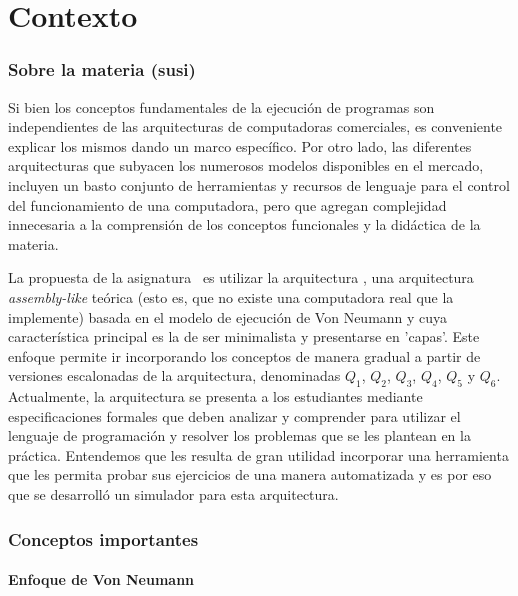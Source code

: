 \part{Contexto}
\section{Sobre la materia \orga (susi)}


Si bien los conceptos fundamentales de la ejecución de programas son independientes de las arquitecturas de computadoras comerciales, es conveniente explicar los mismos dando un marco específico. Por otro lado, las diferentes arquitecturas que subyacen los numerosos modelos disponibles en el mercado, incluyen un basto conjunto de herramientas y recursos de lenguaje para el control del funcionamiento de una computadora, pero que agregan complejidad innecesaria a la comprensión de los conceptos funcionales y la didáctica de la materia.

La propuesta de la asignatura \orga\ es utilizar la arquitectura \Q, una arquitectura \textit{assembly-like} teórica (esto es, que no existe una computadora real que la implemente) basada en el modelo de ejecución de Von Neumann y cuya característica principal es la de ser minimalista y presentarse en 'capas'. Este enfoque permite ir incorporando los conceptos de manera gradual a partir de versiones escalonadas de la arquitectura, denominadas $Q_1$, $Q_2$, $Q_3$, $Q_4$, $Q_5$ y  $Q_6$.\\


Actualmente, la arquitectura se presenta a los estudiantes mediante especificaciones formales que deben analizar y comprender para utilizar el lenguaje de programación y resolver los problemas que se les plantean en la práctica. Entendemos que les resulta de gran utilidad incorporar una herramienta que les permita probar sus ejercicios de una manera automatizada y es por eso que se desarrolló un simulador para esta arquitectura.

\section{Conceptos importantes}

\subsection{Enfoque de Von Neumann}

